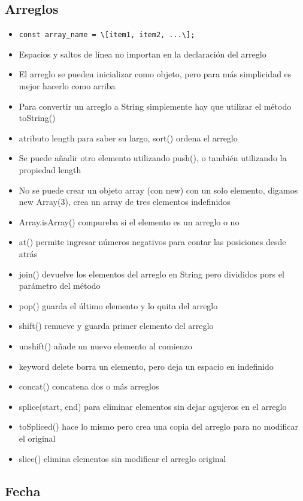 \documentclass{article}
\begin{document}
 \subsection{Arreglos}

 \begin{itemize}
   \item \lstinline{const array_name = \[item1, item2, ...\];  }
   \item Espacios y saltos de línea no importan en la declaración del arreglo
   \item El arreglo se pueden inicializar como objeto, pero para más simplicidad es mejor hacerlo como arriba 
   \item Para convertir un arreglo a String simplemente hay que utilizar el método toString()
   \item atributo length para saber su largo, sort() ordena el arreglo
   \item Se puede añadir otro elemento utilizando push(), o también utilizando la propiedad length
   \item No se puede crear un objeto array (con new) con un solo elemento, digamos new Array(3), crea un array de tres elementos indefinidos
   \item Array.isArray() compureba si el elemento es un arreglo o no
   \item at() permite ingresar números negativos para contar las posiciones desde atrás
   \item join() devuelve los elementos del arreglo en String pero divididos pors el parámetro del método
   \item pop() guarda el último elemento y lo quita del arreglo
   \item shift() remueve y guarda primer elemento del arreglo
   \item unshift() añade un nuevo elemento al comienzo
   \item keyword delete borra un elemento, pero deja un espacio en indefinido
   \item concat() concatena dos o más arreglos
   \item splice(start, end) para eliminar elementos sin dejar agujeros en el arreglo
   \item toSpliced() hace lo mismo pero crea una copia del arreglo para no modificar el original
   \item slice() elimina elementos sin modificar el arreglo original
 \end{itemize}

 \subsection{Fecha}
\end{document}
